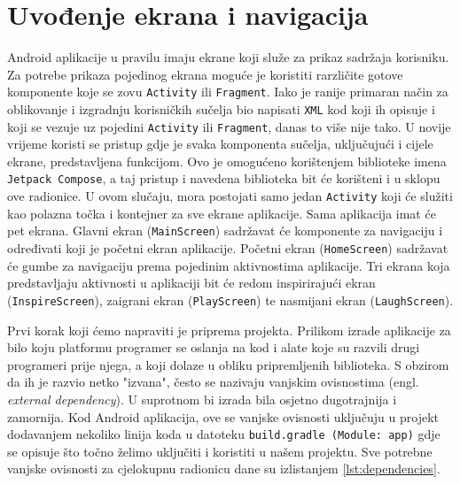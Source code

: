 \documentclass[11pt,a4paper,twoside]{article}
\begin{document}
\section{Uvođenje ekrana i navigacija}

Android aplikacije u pravilu imaju ekrane koji služe za prikaz sadržaja korisniku. Za potrebe prikaza pojedinog ekrana moguće je koristiti rarzličite gotove komponente koje se zovu \texttt{Activity} ili \texttt{Fragment}. Iako je ranije primaran način za oblikovanje i izgradnju korisničkih sučelja bio napisati \texttt{XML} kod koji ih opisuje i koji se vezuje uz pojedini \texttt{Activity} ili \texttt{Fragment}, danas to više nije tako. U novije vrijeme koristi se pristup gdje je svaka komponenta sučelja, uključujući i cijele ekrane, predstavljena funkcijom. Ovo je omogućeno korištenjem biblioteke imena \texttt{Jetpack Compose}, a taj pristup i navedena biblioteka bit će korišteni i u sklopu ove radionice. U ovom slučaju, mora postojati samo jedan \texttt{Activity} koji će služiti kao polazna točka i kontejner za sve ekrane aplikacije. Sama aplikacija imat će pet ekrana. Glavni ekran (\texttt{MainScreen}) sadržavat će komponente za navigaciju i određivati koji je početni ekran aplikacije. Početni ekran (\texttt{HomeScreen}) sadržavat će gumbe za navigaciju prema pojedinim aktivnostima aplikacije. Tri ekrana koja predstavljaju aktivnosti u aplikaciji bit će redom inspirirajući ekran (\texttt{InspireScreen}), zaigrani ekran (\texttt{PlayScreen}) te nasmijani ekran (\texttt{LaughScreen}). 

Prvi korak koji ćemo napraviti je priprema projekta. Prilikom izrade aplikacije za bilo koju platformu programer se oslanja na kod i alate koje su razvili drugi programeri prije njega, a koji dolaze u obliku pripremljenih biblioteka. S obzirom da ih je razvio netko "izvana", često se nazivaju vanjskim ovisnostima (engl. \textit{external dependency}). U suprotnom bi izrada bila osjetno dugotrajnija i zamornija. Kod Android aplikacija, ove se vanjske ovisnosti uključuju u projekt dodavanjem nekoliko linija koda u datoteku \texttt{build.gradle (Module: app)} gdje se opisuje što točno želimo uključiti i koristiti u našem projektu. Sve potrebne vanjske ovisnosti za cjelokupnu radionicu dane su izlistanjem \ref{lst:dependencies}.
\end{document}
